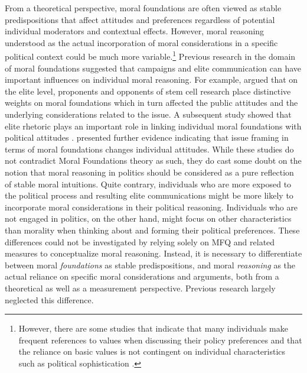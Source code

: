 \documentclass[12pt]{article}
\begin{document}
From a theoretical perspective, moral foundations are often viewed as stable predispositions that affect attitudes and preferences regardless of potential individual moderators and contextual effects. However, moral reasoning understood as the actual incorporation of moral considerations in a specific political context could be much more variable.\footnote{However, there are some studies that indicate that many individuals make frequent references to values when discussing their policy preferences \citep{feldman1992political} and that the reliance on basic values is not contingent on individual characteristics such as political sophistication \citep[e.g.][]{goren2001core,goren2004political,marietta2007values}.} Previous research in the domain of moral foundations suggested that campaigns and elite communication can have important influences on individual moral reasoning. For example, \citet{clifford2013words} argued that on the elite level, proponents and opponents of stem cell research place distinctive weights on moral foundations which in turn affected the public attitudes and the underlying considerations related to the issue. A subsequent study showed that elite rhetoric plays an important role in linking individual moral foundations with political attitudes \citep{clifford2015concerns}. \citet{day2014shifting} presented further evidence indicating that issue framing in terms of moral foundations changes individual attitudes. While these studies do not contradict Moral Foundations theory as such, they do cast some doubt on the notion that moral reasoning in politics should be considered as a pure reflection of stable moral intuitions. Quite contrary, individuals who are more exposed to the political process and resulting elite communications might be more likely to incorporate moral considerations in their political reasoning. Individuals who are not engaged in politics, on the other hand, might focus on other characteristics than morality when thinking about and forming their political preferences. These differences could not be investigated by relying solely on MFQ and related measures to conceptualize moral reasoning. Instead, it is necessary to differentiate between moral \textit{foundations} as stable predispositions, and moral \textit{reasoning} as the actual reliance on specific moral considerations and arguments, both from a theoretical as well as a measurement perspective. Previous research largely neglected this difference.
\end{document}
